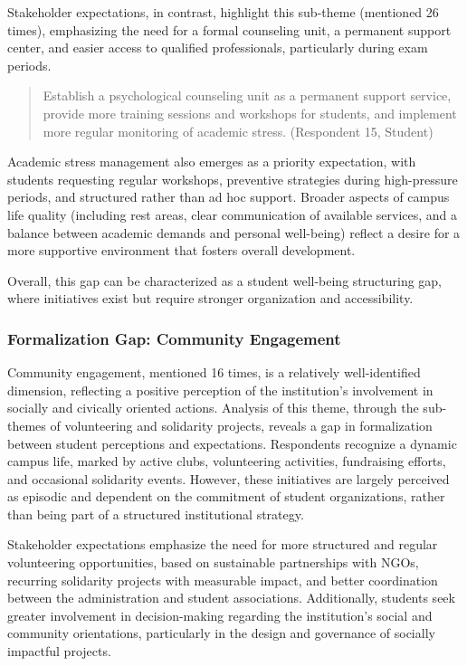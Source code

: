 \documentclass[12pt,a4paper]{article}
\begin{document}
Stakeholder expectations, in contrast, highlight this sub-theme (mentioned 26 times), emphasizing the need for a formal counseling unit, a permanent support center, and easier access to qualified professionals, particularly during exam periods.

\begin{quote}
Establish a psychological counseling unit as a permanent support service, provide more training sessions and workshops for students, and implement more regular monitoring of academic stress. (Respondent 15, Student)
\end{quote}

Academic stress management also emerges as a priority expectation, with students requesting regular workshops, preventive strategies during high-pressure periods, and structured rather than ad hoc support. Broader aspects of campus life quality (including rest areas, clear communication of available services, and a balance between academic demands and personal well-being) reflect a desire for a more supportive environment that fosters overall development.

Overall, this gap can be characterized as a student well-being structuring gap, where initiatives exist but require stronger organization and accessibility.

\subsubsection{Formalization Gap: Community Engagement}

Community engagement, mentioned 16 times, is a relatively well-identified dimension, reflecting a positive perception of the institution’s involvement in socially and civically oriented actions. Analysis of this theme, through the sub-themes of volunteering and solidarity projects, reveals a gap in formalization between student perceptions and expectations. Respondents recognize a dynamic campus life, marked by active clubs, volunteering activities, fundraising efforts, and occasional solidarity events. However, these initiatives are largely perceived as episodic and dependent on the commitment of student organizations, rather than being part of a structured institutional strategy.

Stakeholder expectations emphasize the need for more structured and regular volunteering opportunities, based on sustainable partnerships with NGOs, recurring solidarity projects with measurable impact, and better coordination between the administration and student associations. Additionally, students seek greater involvement in decision-making regarding the institution’s social and community orientations, particularly in the design and governance of socially impactful projects.
\end{document}
